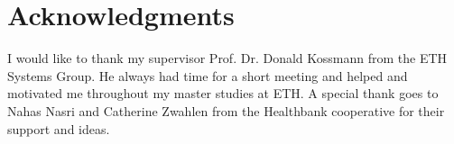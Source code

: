 \newpage
\section{Acknowledgments}
I would like to thank my supervisor Prof. Dr. Donald Kossmann from the ETH Systems Group. He always had time for a short meeting and helped and motivated me throughout my master studies at ETH.\newline
A special thank goes to Nahas Nasri and Catherine Zwahlen from the Healthbank cooperative for their support and ideas.\newline